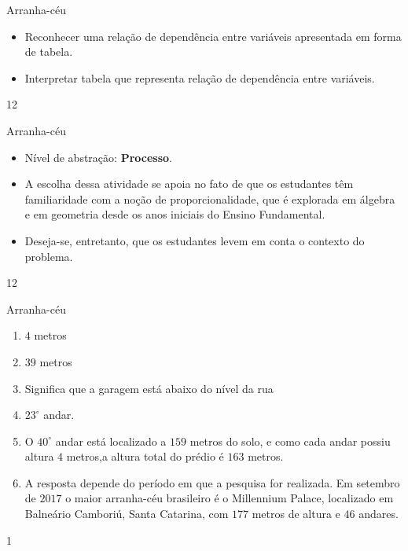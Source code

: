 \clearmargin
\begin{objectives}{Arranha-céu}
{
\begin{itemize}

\item Reconhecer uma relação de dependência entre variáveis apresentada em forma de tabela.

\item Interpretar tabela que representa relação de dependência entre variáveis.

\end{itemize}
}{1}{2}
\end{objectives}
\begin{sugestions}{Arranha-céu}
{
\begin{itemize}
\item Nível de abstração: \textbf{Processo}.

\item A escolha dessa atividade se apoia no fato de que os estudantes têm familiaridade com a noção de proporcionalidade, que é explorada em álgebra e em geometria desde os anos iniciais do Ensino Fundamental.

\item Deseja-se, entretanto, que os estudantes levem em conta o contexto do problema.
\end{itemize}
}{1}{2}
\end{sugestions}
\begin{answer}{Arranha-céu}
{
\begin{enumerate}
\item {} 
$4$ metros
\item {} 
$39$ metros

\item {} 
Significa que a garagem está abaixo do nível da rua

\item {} 
$23^{\circ}$ andar.

\item {} 
O $40^{\circ}$ andar está localizado a $159$ metros do solo, e como cada andar possiu altura $4$ metros,a altura total do prédio é $163$ metros.

\item A resposta depende do período em que a pesquisa for realizada. Em setembro de $2017$ o maior arranha-céu brasileiro é o Millennium Palace, localizado em Balneário Camboriú, Santa Catarina, com $177$ metros de altura e $46$ andares.

\end{enumerate}
}{1}
\end{answer}


